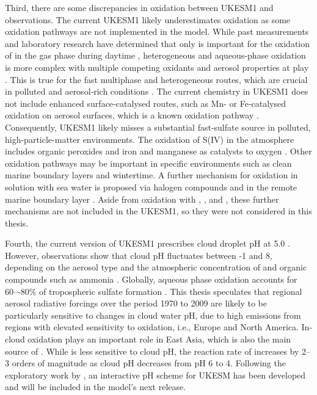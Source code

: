 Third, there are some discrepancies in  oxidation between UKESM1 and observations. The current UKESM1 likely underestimates  oxidation as some  oxidation pathways are not implemented in the model.  While past measurements and laboratory research have determined that only  is important for the oxidation of  in the gas phase during daytime \citep[][and reference therein]{rattiganUptakeGasphaseSO22000, eatoughConversionSO2Sulfate1994}, heterogeneous and aqueous-phase oxidation is more complex with multiple competing oxidants and aerosol properties at play \citep{pattantyusReviewSulfurDioxide2018, seinfeldAtmosphericChemistryPhysics2016}. This is true for the fast multiphase and heterogeneous routes, which are crucial in polluted and aerosol‑rich conditions \citep{ranjithkumarConstraintsGlobalAerosol2021,hardacreEvaluationSO2SO422021,mulcahyDescriptionEvaluationAerosol2020}. The current  chemistry in UKESM1 does not include enhanced surface‑catalysed routes, such as Mn- or Fe‑catalysed oxidation on aerosol surfaces, which is a known oxidation pathway \citep[][and reference therein]{seinfeldAtmosphericChemistryPhysics2016,turnockModelledObservedChanges2015}. Consequently, UKESM1 likely misses a substantial fast-sulfate source in polluted, high-particle-matter environments. The oxidation of S(IV) in the atmosphere includes organic peroxides and iron and manganese as catalysts to oxygen \citet{alexanderTransitionMetalcatalyzedOxidation2009, seinfeldAtmosphericChemistryPhysics2016}. Other  oxidation pathways may be important in specific environments such as clean marine boundary layers and wintertime. A further mechanism for  oxidation in solution with sea water is proposed via halogen compounds  and  in the remote marine boundary layer \citep{vogtMechanismHalogenRelease1996}. Aside from oxidation with , , and , these further mechanisms are not included in the UKESM1, so they were not considered in this thesis. 


Fourth, the current version of UKESM1 prescribes cloud droplet pH at 5.0 \citep[][]{mulcahyDescriptionEvaluationAerosol2020}. However, observations show that cloud pH fluctuates between -1 and 8, depending on the aerosol type and the atmospheric concentration of  and organic compounds such as ammonia \citep[][]{pyeAcidityAtmosphericParticles2020}. Globally, aqueous phase oxidation accounts for 60–-80\% of tropospheric sulfate formation \citep[][]{barthSulfurChemistryNational2000,roelofsAnalysisRegionalBudgets2001}. This thesis speculates that regional aerosol radiative forcings over the period 1970 to 2009 are likely to be particularly sensitive to changes in cloud water pH, due to high emissions from regions with elevated sensitivity to  oxidation, i.e., Europe and North America. In-cloud oxidation plays an important role in East Asia, which is also the main source of . While  is less sensitive to cloud pH, the reaction rate of  increases by 2--3 orders of magnitude as cloud pH decreases from pH 6 to 4. Following the exploratory work by \citet{turnockImpactChangesCloud2019}, an interactive pH scheme for UKESM has been developed and will be included in the model's next release.


